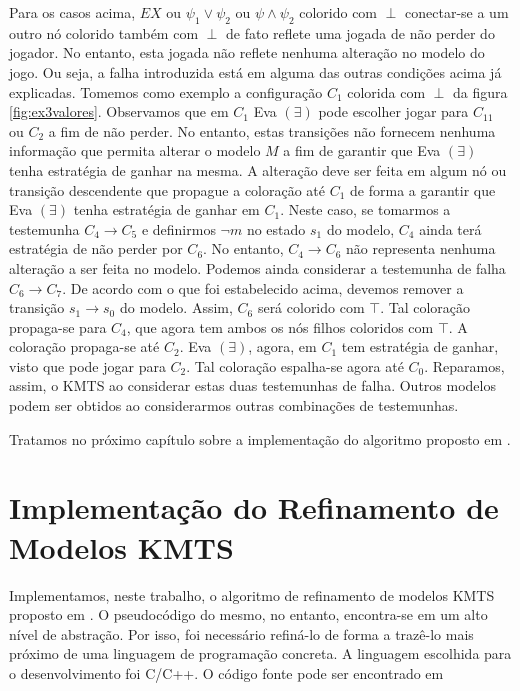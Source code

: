 \documentclass[normaltoc,capchap,capsec,times]{abnt}
\begin{document}
 Para os casos acima, $EX$ ou $\psi_1 \vee \psi_2$ ou $\psi \wedge \psi_2$ colorido com $\perp$ conectar-se a um outro nó colorido também com $\perp$ de fato reflete uma jogada de não perder do jogador. No entanto, esta jogada não reflete nenhuma alteração no modelo do jogo. Ou seja, a falha introduzida está em alguma das outras condições acima já explicadas. Tomemos como exemplo a configuração $C_1$ colorida com $\perp$  da figura \ref{fig:ex3valores}. Observamos que em $C_1 $ Eva $(\exists)$ pode escolher jogar para $C_{11}$ ou $C_2$ a fim de não perder. No entanto, estas transições não fornecem nenhuma informação que permita alterar o modelo $M$ a fim de garantir que Eva $(\exists)$ tenha estratégia de ganhar na mesma. A alteração deve ser feita em algum nó ou transição descendente que propague a coloração até $C_1$ de forma a garantir que Eva $(\exists)$  tenha estratégia de ganhar em $C_1$. Neste caso, se tomarmos a testemunha $C_4 \to C_5$ e definirmos $\neg m$ no estado $s_1$ do modelo, $C_4$ ainda terá estratégia de não perder por $C_6$. No entanto, $C_4 \to C_6$ não representa nenhuma alteração a ser feita no modelo. Podemos ainda considerar a testemunha de falha $C_6 \to C_7$. De acordo com o que foi estabelecido acima, devemos remover a transição $s_1 \to s_0$ do modelo. Assim, $C_6$ será colorido com $\top$. Tal coloração propaga-se para $C_4$, que agora tem ambos os nós filhos coloridos com $\top$. A coloração propaga-se até $C_2$. Eva $(\exists)$, agora, em $C_1$ tem estratégia de ganhar, visto que pode jogar para $C_2$. Tal coloração espalha-se agora até $C_0$. Reparamos, assim, o KMTS ao considerar estas duas testemunhas de falha. Outros modelos podem ser obtidos ao considerarmos outras combinações de testemunhas.

Tratamos no próximo capítulo sobre a implementação do algoritmo proposto em \cite{aline}.
 

\chapter{Implementação do Refinamento de Modelos KMTS}
\label{cap:refinamento}

Implementamos, neste trabalho, o algoritmo de refinamento de modelos KMTS proposto em \cite{aline}. O pseudocódigo do mesmo, no entanto, encontra-se em um alto nível de abstração. Por isso, foi necessário refiná-lo de forma a trazê-lo mais próximo de uma linguagem de programação concreta. A linguagem escolhida para o desenvolvimento foi C/C++. O código fonte pode ser encontrado em \cite{jandson}
\end{document}
